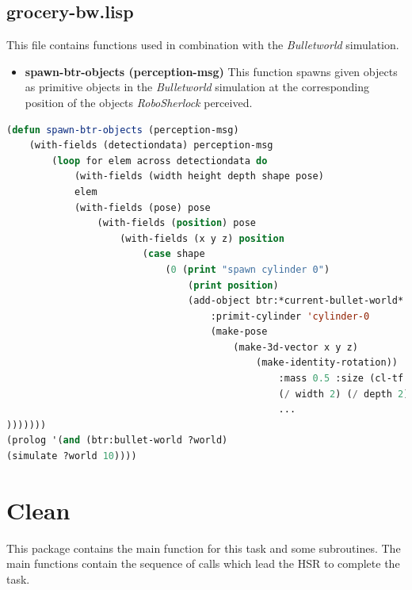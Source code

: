\documentclass[main.tex]{subfiles}
\begin{document}
        \subsection{grocery-bw.lisp}
        This file contains functions used in combination with the \textit{Bulletworld} simulation.
        \begin{itemize}
            \item \textbf{spawn-btr-objects (perception-msg)}
            This function spawns given objects as primitive objects in the \textit{Bulletworld} simulation at the corresponding position of the objects \textit{RoboSherlock} perceived.  
        \end{itemize}
        \begin{lstlisting}[language=lisp]
(defun spawn-btr-objects (perception-msg)
	(with-fields (detectiondata) perception-msg
		(loop for elem across detectiondata do
			(with-fields (width height depth shape pose) 
			elem
			(with-fields (pose) pose
				(with-fields (position) pose
					(with-fields (x y z) position 
						(case shape
							(0 (print "spawn cylinder 0")
								(print position)
								(add-object btr:*current-bullet-world* 
									:primit-cylinder 'cylinder-0 
									(make-pose 
										(make-3d-vector x y z)
											(make-identity-rotation))
												:mass 0.5 :size (cl-tf:make-3d-vector 
												(/ width 2) (/ depth 2) (/ height 2))))
												...
)))))))
(prolog '(and (btr:bullet-world ?world)
(simulate ?world 10))))
        \end{lstlisting}
          \section{Clean}
          \label{clean}
          This package contains the main function for this task and some subroutines. The main functions contain the sequence of calls which lead the HSR to complete the task.
\end{document}
